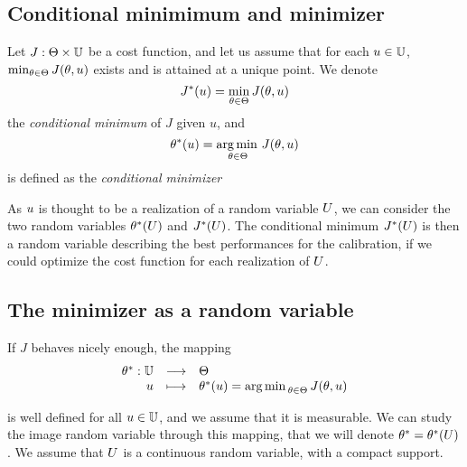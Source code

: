 \documentclass[../../Main_ManuscritThese.tex]{subfiles}
\begin{document}
\subsection{Conditional minimimum and minimizer}
\label{sec:MPE}
\begin{definition}
  Let $J: \Theta \times \mathbb{U}$ be a cost function, and let us assume that for each $u \in \mathbb{U}$, $\min_{\theta \in \Theta} J(\theta,u)$ exists and is attained at a unique point.
  We denote
  \begin{equation}
    J^*(u) = \min_{\theta \in \Theta} J(\theta,u)
  \end{equation}
  the \emph{conditional minimum} of $J$ given $u$, and
  \begin{equation}
    \theta^*(u) = \operatorname*{arg\,min \,}_{\theta\in\Theta} J(\theta, u)
  \end{equation}
 is defined as the \emph{conditional minimizer}
\end{definition}
As $u$ is thought to be a realization of a random variable $U$, we can consider the two random variables $\theta^*(U)$ and $J^*(U)$.
The conditional minimum $J^*(U)$ is then a random variable describing the best performances for the calibration, if we could optimize the cost function for each realization of $U$. %


\subsection{The minimizer as a random variable}
\label{sec:kstar_rv}

If $J$ behaves nicely enough, the mapping
\begin{equation}
  \begin{array}{rcl}
    \theta^*: \mathbb{U} &\longrightarrow& \Theta \\
    u &\longmapsto& \theta^*(u) = \operatorname*{arg\,min \,}_{\theta \in \Theta} J(\theta, u)
  \end{array}
\end{equation}

is well defined for all $u \in \mathbb{U}$, and we assume that it is measurable. We can study the image random variable through this mapping, that we will denote $\theta^* = \theta^*(U)$.
We assume that $U$ is a continuous random variable, with a compact support.
\end{document}

